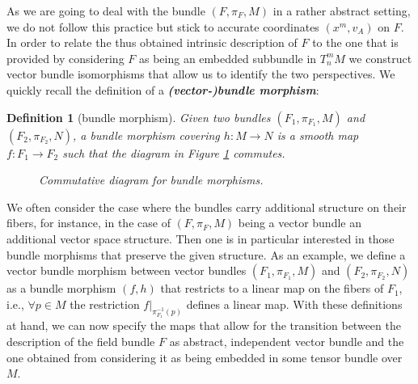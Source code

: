 \documentclass[a4paper,12pt, DIV=14, BCOR=5mm, twoside, headsepline, numbers=noenddot]{scrbook}
\newtheorem{definition}{Definition}[section]
\newtheorem*{remark}{Remark}
\begin{document}
As we are going to deal with the bundle $(F, \pi_F, M)$ in a rather abstract setting, we do not follow this practice but stick to accurate coordinates $(x^m,v_A)$ on $F$. 
In order to relate the thus obtained intrinsic description of $F$ to the one that is provided by considering $F$ as being an embedded subbundle in $T^m_n M$ we construct vector bundle isomorphisms that allow us to identify the two perspectives. We quickly recall the definition of a \textit{\textbf{(vector-)bundle morphism}}:
\begin{definition}[bundle morphism]
Given two bundles $(F_1, \pi_{F_1}, M)$ and $(F_2, \pi_{F_2}, N)$, a bundle morphism covering $h : M \rightarrow N$ is a smooth map $f : F_1 \rightarrow F_2$ such that the diagram in Figure \ref{BundleMorph} commutes.
\begin{figure}[hbt!]
\centering 
{}
\caption{Commutative diagram for bundle morphisms.}\label{BundleMorph}
\end{figure}
\end{definition}

We often consider the case where the bundles carry additional structure on their fibers, for instance, in the case of $(F, \pi_F, M)$ being a vector bundle an additional vector space structure. Then one is in particular interested in those bundle morphisms that preserve the given structure. As an example, we define a vector bundle morphism between vector bundles $(F_1, \pi_{F_1}, M)$ and $(F_2, \pi_{F_2}, N)$ as a bundle morphism $(f,h)$ that restricts to a linear map on the fibers of $F_1$, i.e., $\forall p \in M$ the restriction $f \vert_{\pi_{F_1}^{-1}(p)}$ defines a linear map.
With these definitions at hand, we can now specify the maps that allow for the transition between the description of the field bundle $F$ as abstract, independent vector bundle and the one obtained from considering it as being embedded in some tensor bundle over $M$.
\end{document}
